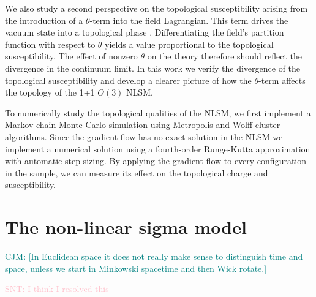 \documentclass[a4paper,11pt]{article}
\newcommand\chris[1]{\textcolor{teal}{CJM: #1}}
\newcommand\stuart[1]{\textcolor{pink}{SNT: #1}}
\begin{document}
We also study a second perspective on the topological susceptibility arising from the introduction of a $\theta$-term into the field Lagrangian. This term drives the vacuum state into a topological phase \cite{allessalom2008}. Differentiating the field's partition function with respect to $\theta$ yields a value proportional to the topological susceptibility. The effect of nonzero $\theta$ on the theory therefore should reflect the divergence in the continuum limit. In this work we verify the divergence of the topological susceptibility and develop a clearer picture of how the $\theta$-term affects the topology of the 1+1 $O(3)$ NLSM.

To numerically study the topological qualities of the NLSM, we first implement a Markov chain Monte Carlo simulation using Metropolis and Wolff cluster \cite{wolff1989} algorithms. Since the gradient flow has no exact solution in the NLSM we implement a numerical solution using a fourth-order Runge-Kutta approximation with automatic step sizing. By applying the gradient flow to every configuration in the sample, we can measure its effect on the topological charge and susceptibility.

\section{The non-linear sigma model}
\label{sec:nlsm}
\chris{[In Euclidean space it does not really make sense to distinguish time and space, unless we start in Minkowski spacetime and then Wick rotate.]}

\stuart{I think I resolved this}
\end{document}
